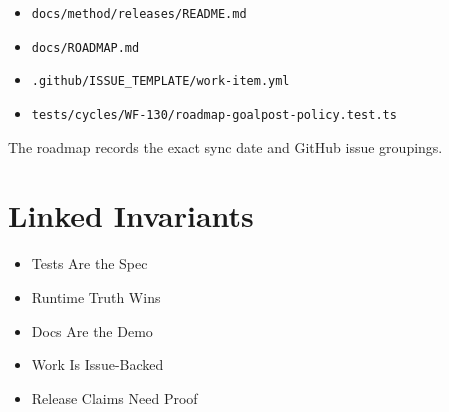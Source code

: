 \begin{itemize}
\tightlist
\item
  \texttt{d\allowbreak{}o\allowbreak{}c\allowbreak{}s\allowbreak{}/\allowbreak{}m\allowbreak{}e\allowbreak{}t\allowbreak{}h\allowbreak{}o\allowbreak{}d\allowbreak{}/\allowbreak{}r\allowbreak{}e\allowbreak{}l\allowbreak{}e\allowbreak{}a\allowbreak{}s\allowbreak{}e\allowbreak{}s\allowbreak{}/\allowbreak{}R\allowbreak{}E\allowbreak{}A\allowbreak{}D\allowbreak{}M\allowbreak{}E\allowbreak{}.\allowbreak{}m\allowbreak{}d}
\item
  \texttt{d\allowbreak{}o\allowbreak{}c\allowbreak{}s\allowbreak{}/\allowbreak{}R\allowbreak{}O\allowbreak{}A\allowbreak{}D\allowbreak{}M\allowbreak{}A\allowbreak{}P\allowbreak{}.\allowbreak{}m\allowbreak{}d}
\item
  \texttt{.\allowbreak{}g\allowbreak{}i\allowbreak{}t\allowbreak{}h\allowbreak{}u\allowbreak{}b\allowbreak{}/\allowbreak{}I\allowbreak{}S\allowbreak{}S\allowbreak{}U\allowbreak{}E\allowbreak{}\_\allowbreak{}T\allowbreak{}E\allowbreak{}M\allowbreak{}P\allowbreak{}L\allowbreak{}A\allowbreak{}T\allowbreak{}E\allowbreak{}/\allowbreak{}w\allowbreak{}o\allowbreak{}r\allowbreak{}k\allowbreak{}-\allowbreak{}i\allowbreak{}t\allowbreak{}e\allowbreak{}m\allowbreak{}.\allowbreak{}y\allowbreak{}m\allowbreak{}l}
\item
  \texttt{t\allowbreak{}e\allowbreak{}s\allowbreak{}t\allowbreak{}s\allowbreak{}/\allowbreak{}c\allowbreak{}y\allowbreak{}c\allowbreak{}l\allowbreak{}e\allowbreak{}s\allowbreak{}/\allowbreak{}W\allowbreak{}F\allowbreak{}-\allowbreak{}1\allowbreak{}3\allowbreak{}0\allowbreak{}/\allowbreak{}r\allowbreak{}o\allowbreak{}a\allowbreak{}d\allowbreak{}m\allowbreak{}a\allowbreak{}p\allowbreak{}-\allowbreak{}g\allowbreak{}o\allowbreak{}a\allowbreak{}l\allowbreak{}p\allowbreak{}o\allowbreak{}s\allowbreak{}t\allowbreak{}-\allowbreak{}p\allowbreak{}o\allowbreak{}l\allowbreak{}i\allowbreak{}c\allowbreak{}y\allowbreak{}.\allowbreak{}t\allowbreak{}e\allowbreak{}s\allowbreak{}t\allowbreak{}.\allowbreak{}t\allowbreak{}s}
\end{itemize}

The roadmap records the exact sync date and GitHub issue groupings.

\section{Linked Invariants}\label{record-212-linked-invariants}

\begin{itemize}
\tightlist
\item
  Tests Are the Spec
\item
  Runtime Truth Wins
\item
  Docs Are the Demo
\item
  Work Is Issue-Backed
\item
  Release Claims Need Proof
\end{itemize}

